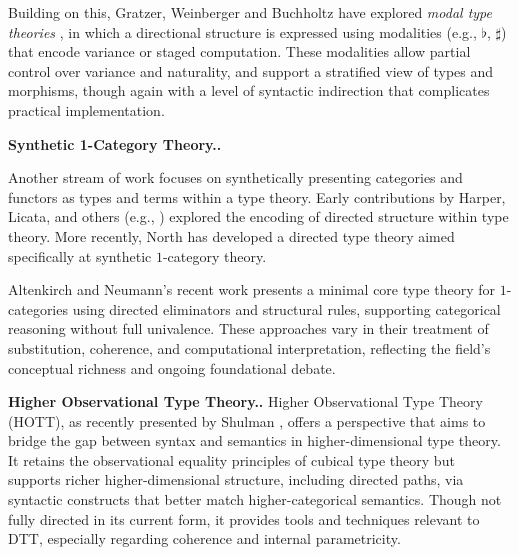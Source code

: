 \documentclass[a4paper,11pt]{article}
\renewcommand{\paragraph}[1]{\textbf{#1.}}
\begin{document}
Building on this, Gratzer, Weinberger and Buchholtz have explored \emph{modal type
  theories} \cite{gratzer2024directed,gratzer2025yoneda}, in which a directional
structure is expressed using modalities (e.g., \(\flat\), \(\sharp\))
that encode variance or staged computation. These modalities allow
partial control over variance and naturality, and support a stratified
view of types and morphisms, though again with a level of syntactic
indirection that complicates practical implementation.

\paragraph{Synthetic 1-Category Theory.}

Another stream of work focuses on synthetically presenting categories
and functors as types and terms within a type theory. Early
contributions by Harper, Licata, and others (e.g., \cite{licata20112})
explored the encoding of directed structure within type theory. More
recently, North has developed a directed type theory \cite{north_2019}
aimed specifically at synthetic $1$-category theory.

Altenkirch and Neumann’s recent work
\cite{altenkirch_neumann_2024} presents a minimal core type theory for
$1$-categories using directed eliminators and structural rules,
supporting categorical reasoning without full univalence. These
approaches vary in their treatment of substitution, coherence, and
computational interpretation, reflecting the field's conceptual
richness and ongoing foundational debate.

\paragraph{Higher Observational Type Theory.}
Higher Observational Type Theory (HOTT), as recently presented by
Shulman \cite{shulman2022}, offers a perspective that aims to bridge
the gap between syntax and semantics in higher-dimensional type
theory. It retains the observational equality principles of cubical
type theory but supports richer higher-dimensional structure,
including directed paths, via syntactic constructs that better match
higher-categorical semantics. Though not fully directed in its current
form, it provides tools and techniques relevant to DTT, especially
regarding coherence and internal parametricity.
\end{document}
